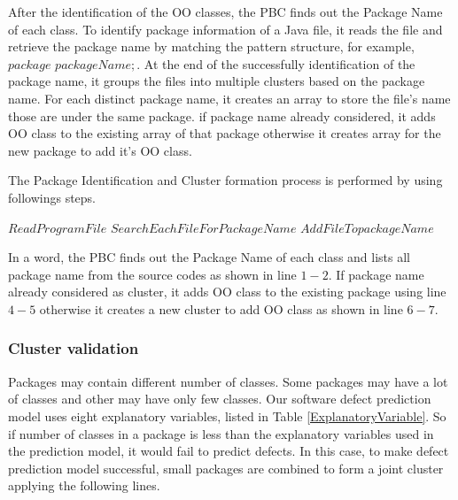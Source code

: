 \documentclass[12pt]{report}
\begin{document}
After the identification of the OO classes, the PBC finds out the Package Name of each class. To identify package information of a Java file, it reads the file and retrieve the package name by matching the pattern structure, for example, $package$ $packageName;$. At the end of the successfully identification of the package name, it groups the files into multiple clusters based on the package name. For each distinct package name, it creates an array to store the file's name those are under the same package. if package name already considered, it adds OO class to the existing array of that package otherwise it creates array for the new package to add it's OO class.

The Package Identification and Cluster formation process is performed by using followings steps.  
\begin{algorithm}
\label{Package_Identification_and_Cluster_formation}
\begin{algorithmic}[1]

			\STATE $Read Program File$ 
			\STATE $Search Each File For PackageName $  
				\STATE $Add File To packageName$
			\ENDIF
	\ENDFOR
	

\end{algorithmic}
\end{algorithm}
In a word, the PBC finds out the Package Name of each class and lists all package name from the source codes as shown in line $1-2$. If package name already considered as cluster, it adds OO class to the existing package using line $4-5$ otherwise it creates a new cluster to add OO class as shown in line $6-7$.     


\subsubsection{Cluster validation} Packages may contain different number of classes. Some packages may have a lot of classes and other may have only few classes. Our software defect prediction model uses eight explanatory variables, listed in Table \ref{ExplanatoryVariable}. So if number of classes in a package is less than the explanatory variables used in the prediction model, it would fail to predict defects. In this case, to make defect prediction model successful, small packages are combined to form a joint cluster applying the following lines. 
\end{document}
